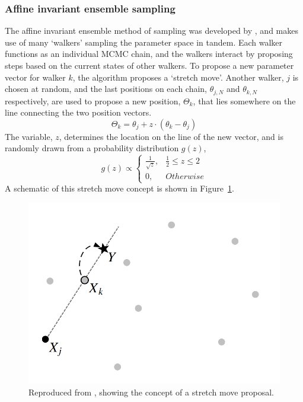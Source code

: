 \subsubsection{Affine invariant ensemble sampling}\label{sect:modelling:Affine invariant ensemble sampling}
The affine invariant ensemble method of sampling was developed by \citet{goodman2010}, and makes use of many `walkers' sampling the parameter space in tandem.
Each walker functions as an individual MCMC chain, and the walkers interact by proposing steps based on the current states of other walkers. To propose a new parameter vector for walker $k$, the algorithm proposes a `stretch move'. Another walker, $j$ is chosen at random, and the last positions on each chain, $\theta_{j,N}$ and $\theta_{k,N}$ respectively, are used to propose a new position, $\Theta_k$, that lies somewhere on the line connecting the two position vectors.
\begin{equation}
    \Theta_k = \theta_j + z \cdot (\theta_k - \theta_j)
\end{equation}
The variable, $z$, determines the location on the line of the new vector, and is randomly drawn from a probability distribution $g(z)$,
\begin{equation}
    g(z) \propto
    \begin{cases}
        \frac{1}{\sqrt{z}}, & \frac{1}{2} \le z \le 2 \\
        0, & Otherwise
    \end{cases}
\end{equation}
A schematic of this stretch move concept is shown in Figure~\ref{fig:modelling:stretch move}.
\begin{figure}
    \centering
    \includegraphics[width=.7\textwidth]{figures/modelling/stretch_move.png}
    \caption{Reproduced from \citet{goodman2010}, showing the concept of a stretch move proposal.}\label{fig:modelling:stretch move}
\end{figure}

